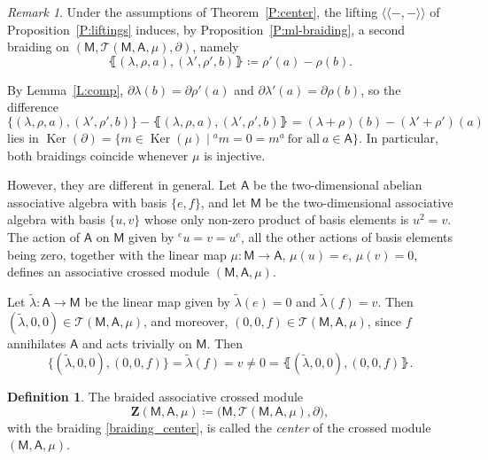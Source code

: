 \documentclass[12pt,reqno]{amsart}
\theoremstyle{plain}
\theoremstyle{definition}
\newtheorem{definition}[theorem]{Definition}
\theoremstyle{remark}
\newtheorem{remark}[theorem]{Remark}
\def\lam{\lambda}
\def\Ker{\operatorname{Ker}}
\newcommand{\A}{\ensuremath{\mathsf{A}}}
\newcommand{\MM}{\ensuremath{\mathsf{M}}}
\newcommand{\ZC}{\ensuremath{\mathbf{Z}}}
\newcommand{\T}{\ensuremath{\mathcal{T}}}
\numberwithin{equation}{section}
\begin{document}
\begin{remark}\label{R:diff}
	Under the assumptions of Theorem~\ref{P:center}, the lifting  $\langle\!\langle-,-\rangle\!\rangle$ of Proposition~\ref{P:liftings} induces, by Proposition~\ref{P:ml-braiding}, a second braiding on $(\MM,\T(\MM,\A,\mu),\partial)$, namely
	\[\lBrace (\lambda,\rho,a),(\lambda',\rho',b) \rBrace \coloneqq \rho'(a)-\rho(b).\]

	By Lemma~\ref{L:comp}, $\partial\lam(b)=\partial\rho'(a)$ and $\partial\lam'(a)=\partial\rho(b)$, so the difference
	\[
	\{(\lambda,\rho,a),(\lambda',\rho',b)\}-\lBrace(\lambda,\rho,a),(\lambda',\rho',b)\rBrace=(\lam+\rho)(b)-(\lam'+\rho')(a)
	\]
	lies in $\Ker(\partial)=\{m\in\Ker(\mu)\mid {}^am=0=m^a \ \text{for all} \ a\in\A\}$. In particular, both braidings coincide whenever $\mu$ is injective.

	However, they are different in general. Let $\A$ be the two-dimensional abelian associative algebra with basis $\{e,f\}$, and let $\MM$ be the two-dimensional associative algebra with basis $\{u,v\}$ whose only non-zero product of basis elements is $u^2=v$. The action of $\A$ on $\MM$ given by ${}^eu=v=u^e$, all the other actions of basis elements being zero, together with the linear map $\mu\colon\MM\to\A$, $\mu(u)=e$, $\mu(v)=0$, defines an associative crossed module $(\MM,\A,\mu)$. 
	
	Let $\tilde{\lam} \colon\A\to\MM$ be the linear map given by $\tilde{\lam}(e)=0$ and $\tilde{\lam}(f)=v$. Then $(\tilde{\lam},0,0)\in\T(\MM,\A,\mu)$, and moreover, $(0,0,f)\in\T(\MM,\A,\mu)$, since $f$ annihilates $\A$ and acts trivially on $\MM$. Then
	\[
	\{(\tilde{\lam},0,0),(0,0,f)\}=\tilde{\lam}(f)=v\neq0=\lBrace(\tilde{\lam},0,0),(0,0,f)\rBrace.
	\]
\end{remark}

\begin{definition}\label{D:center}
The braided  associative crossed module 
\[
\ZC(\MM,\A,\mu)
\coloneqq
\bigl(\MM,\T(\MM,\A,\mu),\partial\bigr),
\]
with the braiding \eqref{braiding_center}, is called the \emph{center} of the crossed module $(\MM,\A,\mu)$.
\end{definition}
\end{document}
